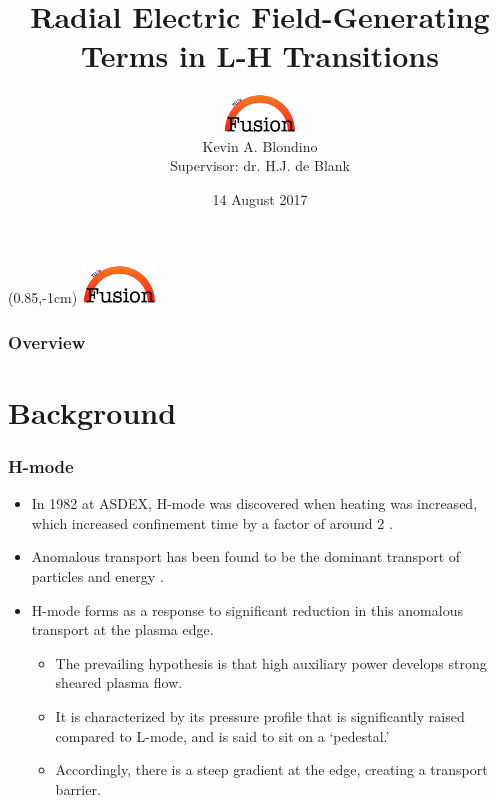 \documentclass{beamer}
\title[$E_r$-Generating Terms in L-H Transitions]{Radial Electric Field-Generating Terms in L-H Transitions}
\author[K.A. Blondino]{\includegraphics[height=1cm]{../../Graphics/tue_fusion_logo.png} \\ Kevin A. Blondino \\
	Supervisor: dr. H.J. de Blank}
\institute[TU/e]{Eindhoven University of Technology \\
	\medskip
	\textit{k.blondino@student.tue.nl}}
\date{14 August 2017}
\begin{document}
\begin{frame}
\titlepage
\end{frame}

{
\begin{textblock*}{100mm}(0.85\textwidth,-1cm)
	\includegraphics[height=1cm,width=2cm]{../../Graphics/tue_fusion_logo.png}
\end{textblock*}
}

\begin{frame}
\frametitle{Overview}
\tableofcontents
\end{frame}


\section{Background}
\begin{frame}
\frametitle{H-mode}
\begin{itemize}
	\item In 1982 at ASDEX, H-mode was discovered when heating was increased, which increased confinement time by a factor of around 2 \cite{wagner_development_1984}.
	\item Anomalous transport has been found to be the dominant transport of particles and energy \cite{freidberg_plasma_2007}.
	\item H-mode forms as a response to significant reduction in this anomalous transport at the plasma edge.
	\begin{itemize}
		\item The prevailing hypothesis is that high auxiliary power develops strong sheared plasma flow.
		\item It is characterized by its pressure profile that is significantly raised compared to L-mode, and is said to sit on a `pedestal.'
		\item Accordingly, there is a steep gradient at the edge, creating a transport barrier.
	\end{itemize}
\end{itemize}
\end{frame}
\end{document}
